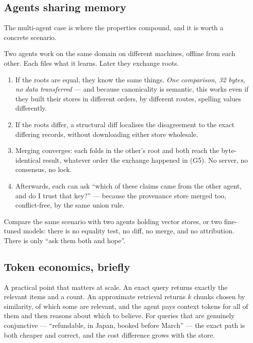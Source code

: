 \subsection{Agents sharing memory}

The multi-agent case is where the properties compound, and it is worth a
concrete scenario.

Two agents work on the same domain on different machines, offline from each
other. Each files what it learns. Later they exchange roots.

\begin{enumerate}[leftmargin=1.7em]
\item If the roots are equal, they know the same things. \emph{One comparison,
  32 bytes, no data transferred} --- and because canonicality is semantic, this
  works even if they built their stores in different orders, by different
  routes, spelling values differently.
\item If the roots differ, a structural diff localises the disagreement to the
  exact differing records, without downloading either store wholesale.
\item Merging converges: each folds in the other's root and both reach the
  byte-identical result, whatever order the exchange happened in (G5). No
  server, no consensus, no lock.
\item Afterwards, each can ask ``which of these claims came from the other
  agent, and do I trust that key?'' --- because the provenance store merged
  too, conflict-free, by the same union rule.
\end{enumerate}

Compare the same scenario with two agents holding vector stores, or two
fine-tuned models: there is no equality test, no diff, no merge, and no
attribution. There is only ``ask them both and hope''.

\subsection{Token economics, briefly}

A practical point that matters at scale. An exact query returns exactly the
relevant items and a count. An approximate retrieval returns $k$ chunks chosen
by similarity, of which some are relevant, and the agent pays context tokens
for all of them and then reasons about which to believe. For queries that are
genuinely conjunctive --- ``refundable, in Japan, booked before March'' ---
the exact path is both cheaper and correct, and the cost difference grows with
the store.

